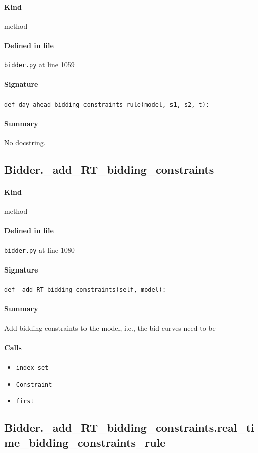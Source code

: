 \documentclass[11pt]{report}
\begin{document}
\paragraph{Kind} method
\paragraph{Defined in file} \texttt{bidder.py} at line 1059
\paragraph{Signature} \texttt{def day\_ahead\_bidding\_constraints\_rule(model, s1, s2, t):}
\paragraph{Summary} No docstring.
\subsection{Bidder.\_add\_RT\_bidding\_constraints}
\label{def:bidder.py:Bidder._add_RT_bidding_constraints:L1080}
\paragraph{Kind} method
\paragraph{Defined in file} \texttt{bidder.py} at line 1080
\paragraph{Signature} \texttt{def \_add\_RT\_bidding\_constraints(self, model):}
\paragraph{Summary} Add bidding constraints to the model, i.e., the bid curves need to be
\paragraph{Calls}
\begin{itemize}[leftmargin=*]
  \item \texttt{index\_set}
  \item \texttt{Constraint}
  \item \texttt{first}
\end{itemize}
\subsection{Bidder.\_add\_RT\_bidding\_constraints.real\_time\_bidding\_constraints\_rule}
\label{def:bidder.py:Bidder._add_RT_bidding_constraints.real_time_bidding_constraints_rule:L1092}
\end{document}
